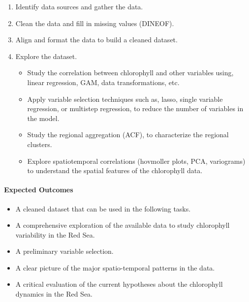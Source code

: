 \begin{enumerate} 

\item Identify data sources and gather the data.

\item Clean the data and fill in missing values (DINEOF).

\item Align and format the data to build a cleaned dataset.

\item Explore the dataset.

\begin{itemize} 

\item Study the correlation between chlorophyll and other variables using,
linear regression, GAM, data transformations, etc.

\item Apply variable selection techniques such as, lasso, single variable
regression, or multistep regression, to reduce the number of variables in the
model.

\item Study the regional aggregation (ACF), to characterize the regional
clusters.

\item Explore spatiotemporal correlations (hovmoller plots, PCA, variograms) to
understand the spatial features of the chlorophyll data.

\end{itemize}

\end{enumerate}

\paragraph{Expected Outcomes}

\begin{itemize} 

\item A cleaned dataset that can be used in the following tasks.

\item A comprehensive exploration of the available data to study chlorophyll
variability in the Red Sea.

\item A preliminary variable selection.

\item A clear picture of the major spatio-temporal patterns in the data.

\item A critical evaluation of the current hypotheses about the chlorophyll
dynamics in the Red Sea.

\end{itemize}
